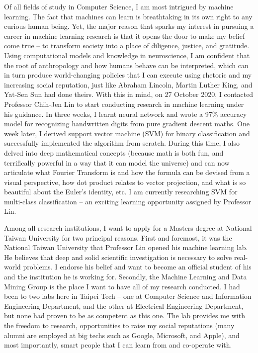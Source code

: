 \documentclass[letterpaper,12pt]{article}
\begin{document}
Of all fields of study in Computer Science, I am most intrigued by machine learning. The fact that machines can learn is breathtaking in its own right to any curious human being. Yet, the major reason that sparks my interest in pursuing a career in machine learning research is that it opens the door to make my belief come true -- to transform society into a place of diligence, justice, and gratitude. Using computational models and knowledge in neuroscience, I am confident that the root of anthropology and how humans behave can be interpreted, which can in turn produce world-changing policies that I can execute using rhetoric and my increasing social reputation, just like Abraham Lincoln, Martin Luther King, and Yat-Sen Sun had done theirs. With this in mind, on 27 October 2020, I contacted Professor Chih-Jen Lin to start conducting research in machine learning under his guidance. In three weeks, I learnt neural network and wrote a 97\% accuracy model for recognizing handwritten digits from pure gradient descent maths. One week later, I derived support vector machine (SVM) for binary classification and successfully implemented the algorithm from scratch. During this time, I also delved into deep mathematical concepts (because math is both fun, and terrifically powerful in a way that it can model the universe) and can now articulate what Fourier Transform is and how the formula can be devised from a visual perspective, how dot product relates to vector projection, and what is so beautiful about the Euler’s identity, etc. I am currently researching SVM for multi-class classification -- an exciting learning opportunity assigned by Professor Lin.

Among all research institutions, I want to apply for a Masters degree at National Taiwan University for two principal reasons. First and foremost, it was the National Taiwan University that Professor Lin opened his machine learning lab. He believes that deep and solid scientific investigation is necessary to solve real-world problems. I endorse his belief and want to become an official student of his and the institution he is working for. Secondly, the Machine Learning and Data Mining Group is the place I want to have all of my research conducted. I had been to two labs here in Taipei Tech -- one at Computer Science and Information Engineering Department, and the other at Electrical Engineering Department, but none had proven to be as competent as this one. The lab provides me with the freedom to research, opportunities to raise my social reputations (many alumni are employed at big techs such as Google, Microsoft, and Apple), and most importantly, smart people that I can learn from and co-operate with.
\end{document}

